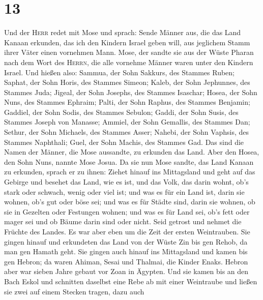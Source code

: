 \hypertarget{section-12}{%
\section{13}\label{section-12}}

 Und der \textsc{Herr} redet mit Mose und sprach:
 Sende Männer aus, die das Land Kanaan erkunden, das ich
den Kindern Israel geben will, aus jeglichem Stamm ihrer Väter einen
vornehmen Mann.  Mose, der sandte sie aus der Wüste Pharan
nach dem Wort des \textsc{Herrn}, die alle vornehme Männer waren unter
den Kindern Israel.  Und hießen also: Sammua, der Sohn
Sakkurs, des Stammes Ruben;  Saphat, der Sohn Horis, des
Stammes Simeon;  Kaleb, der Sohn Jephunnes, des Stammes
Juda;  Jigeal, der Sohn Josephs, des Stammes Isaschar;
 Hosea, der Sohn Nuns, des Stammes Ephraim; 
Palti, der Sohn Raphus, des Stammes Benjamin;  Gaddiel,
der Sohn Sodis, des Stammes Sebulon;  Gaddi, der Sohn
Susis, des Stammes Joseph von Manasse;  Ammiel, der Sohn
Gemallis, des Stammes Dan;  Sethur, der Sohn Michaels,
des Stammes Asser;  Nahebi, der Sohn Vaphsis, des Stammes
Naphthali;  Guel, der Sohn Machis, des Stammes Gad.
 Das sind die Namen der Männer, die Mose aussandte, zu
erkunden das Land. Aber den Hosea, den Sohn Nuns, nannte Mose Josua.
 Da sie nun Mose sandte, das Land Kanaan zu erkunden,
sprach er zu ihnen: Ziehet hinauf ins Mittagsland und geht auf das
Gebirge  und besehet das Land, wie es ist, und das Volk,
das darin wohnt, ob's stark oder schwach, wenig oder viel ist;
 und was es für ein Land ist, darin sie wohnen, ob's gut
oder böse sei; und was es für Städte sind, darin sie wohnen, ob sie in
Gezelten oder Festungen wohnen;  und was es für Land sei,
ob's fett oder mager sei und ob Bäume darin sind oder nicht. Seid
getrost und nehmet die Früchte des Landes. Es war aber eben um die Zeit
der ersten Weintrauben.  Sie gingen hinauf und erkundeten
das Land von der Wüste Zin bis gen Rehob, da man gen Hamath geht.
 Sie gingen auch hinauf ins Mittagsland und kamen bis gen
Hebron; da waren Ahiman, Sesai und Thalmai, die Kinder Enaks. Hebron
aber war sieben Jahre gebaut vor Zoan in Ägypten.  Und
sie kamen bis an den Bach Eskol und schnitten daselbst eine Rebe ab mit
einer Weintraube und ließen sie zwei auf einem Stecken tragen, dazu auch
